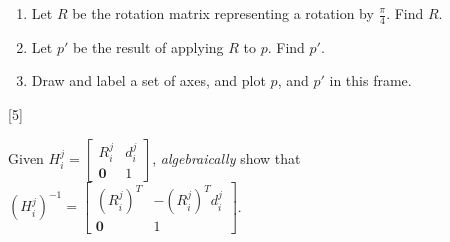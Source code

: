 \documentclass{16384_doc}
\begin{document}
\begin{questions}
    \begin{enumerate}[label=\alph*.]
    \item \text{[1 point]}
    Let $R$ be the rotation matrix representing a rotation by $\frac{\pi}4$.  Find $R$.
    \begin{tcolorbox}[height=3cm]
    \end{tcolorbox}
    \item \text{[1 point]}
    Let $p'$ be the result of applying $R$ to $p$.  Find $p'$.

    \begin{tcolorbox}[height=3cm]
    \end{tcolorbox}
    \item \text{[1 point]}
    Draw and label a set of axes, and plot $p$, and $p'$ in this frame.

    \begin{tcolorbox}[height=3cm]
    \end{tcolorbox}
    \end{enumerate}

    


    [5]
    
    Given $H_i^j = \begin{bmatrix} R_i^j & d_i^j \\ \mathbf{0} & 1 \end{bmatrix}$, \emph{algebraically} show that $(H_i^j)^{-1} = \begin{bmatrix} (R_i^j)^T & -(R_i^j)^T d_i^j \\ \mathbf{0} & 1 \end{bmatrix}$.


\end{questions}
\end{document}
